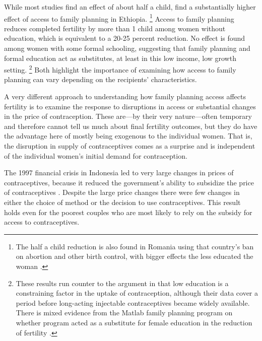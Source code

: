 \documentclass[letterpaper,12pt]{article}
\begin{document}
While most studies find an effect of about half a child,
\citet{Portner2011} find a substantially higher effect of access to
family planning in Ethiopia.%
\footnote{
The half a child reduction is also found in Romania using that country's
ban on abortion and other birth control, with bigger effects the less
educated the woman \citep{Pop-Eleches2010}.}
Access to family planning reduces completed fertility by more than 1
child among women without education, which is equivalent to a 20-25
percent reduction.
No effect is found among women with some formal schooling, suggesting
that family planning and formal education act as substitutes, at least
in this low income, low growth setting.%
\footnote{
These results run counter to the argument in \citet{Feyisetan1996} that
low education is a constraining factor in the uptake of contraception,
although their data cover a period before long-acting injectable
contraceptives became widely available.
There is mixed evidence from the Matlab family planning program on
whether program acted as a substitute for female education in the
reduction of fertility \citep{Sinha2005,Joshi2007}.}
Both highlight the importance of examining how access to family planning
can vary depending on the recipients' characteristics.

A very different approach to understanding how family planning access
affects fertility is to examine the response to disruptions in access or
substantial changes in the price of contraception.
These are---by their very nature---often temporary and therefore cannot
tell us much about final fertility outcomes, but they do have the
advantage here of mostly being exogenous to the individual women.
That is, the disruption in supply of contraceptives comes as a surprise
and is independent of the individual women's initial demand for
contraception.

The 1997 financial crisis in Indonesia led to very large changes in
prices of contraceptives, because it reduced the government's ability to
subsidize the price of contraceptives \citep{McKelvey2012}.
Despite the large price changes there were few changes in either the
choice of method or the decision to use contraceptives.
This result holds even for the poorest couples who are most likely to
rely on the subsidy for access to contraceptives.
\end{document}
